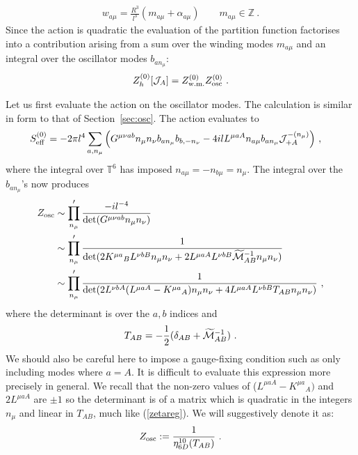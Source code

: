 \documentclass[11pt]{article}
\numberwithin{equation}{section}
\begin{document}
\begin{align}\label{wis}
w_{a\mu} = \frac{R^3}{l^3}\left( m_{a\mu} + \alpha_{a\mu }    \right)\qquad m_{a\mu} \in {\mathbb Z} \ .
\end{align}
Since the action is quadratic the evaluation of the partition function factorises into a contribution arising  from a sum over the winding modes $m_{a\mu}$ and an integral over the oscillator modes $b_{a n_\mu}$:
\begin{align}
    Z_h^{(0)}[{\cal J}_{A}] = Z^{(0)}_{\text{w.m.}} Z^{(0)}_{\rm osc}\ .
\end{align}
 
 
 Let us first evaluate the action on the oscillator modes. 
The calculation is similar in form to that of Section~\ref{sec:osc}. The action evaluates to
\begin{align}
S_{\text{eff} }^{(0)}= -2\pi l^4&\sum_{a, n_{\mu }}\Big(G^{\mu\nu ab}n_\mu n_\nu b_{a n_{\mu }}  b_{b,-n_{\nu}}   - {4i}{l} L^{\mu a A}n_{a\mu }b_{an_{ \mu }}{\cal J}_{+A}^{-(n_{ \mu})}\Big)	\ ,
\end{align} 
where the integral over ${\mathbb T}^6$ has imposed $n_{a\mu}=-n_{b\mu}=n_{\mu}$. The integral over the $b_{an_\mu}$'s now produces
\begin{align}
    Z_{\rm osc}&\sim  \prod'_{n_\mu}\frac{-i l^{-4}}{\det (G^{\mu\nu ab}n_\mu n_\nu)}\nonumber\\
    &\sim \prod'_{n_\mu}\frac{1}{ \det (2K^{\mu a}{}_BL^{\nu b B}{}n_\mu n_\nu+2L^{\mu a A}L^{\nu b B}\widetilde{\cal M}^{-1}_{AB}n_\mu n_\nu)}\nonumber\\
    &\sim \prod'_{n_\mu}\frac{1}{\det (2L^{\nu b A}{}(L^{\mu a A} -K^{\mu a}{}_A)n_\mu n_\nu+4L^{\mu a A}L^{\nu b B}T_{AB}n_\mu n_\nu)}
    \ ,
\end{align}
where the determinant is over the $a,b$ indices and \begin{align}
    { T}_{AB}= -\frac12({\delta}_{AB}+\widetilde{\cal M}^{-1}_{AB})\ .
\end{align}  
We should also be careful here to impose a gauge-fixing condition such as only including modes where $a=A$. It is difficult to evaluate this expression more precisely in general. We recall that the non-zero values of ($L^{\mu a A}-K^{\mu a}{}_A)$ and $2L^{\mu a A}$ are $\pm1$ so the determinant is of a matrix which is quadratic in the integers $n_\mu$ and linear in $T_{AB}$, much like  (\ref{zetareg}). We will suggestively denote it as:
\begin{align}
  Z_{\rm osc}
    :=  \frac{1}{\eta^{10}_{6D}({  T}_{AB})}\ .
\end{align}
 
\end{document}
